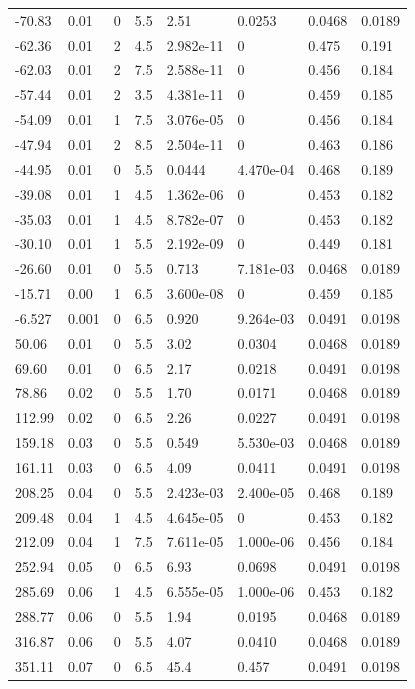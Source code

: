 \documentclass[preview]{standalone}
\begin{document}
{{\begin{tabular}{L{1.2cm}C{1.2cm} C{0.3cm}C{0.5cm} C{1.4cm}C{1.4cm} C{1.4cm}C{1.4cm}}
  -70.83  &  0.01  & 0     & 5.5 &  2.51  & 0.0253  & 0.0468 &  0.0189   \\ 
  -62.36  &  0.01  & 2     & 4.5 &  2.982e-11  & 0  & 0.475 &  0.191   \\ 
  -62.03  &  0.01  & 2     & 7.5 &  2.588e-11  & 0  & 0.456 &  0.184   \\ 
  -57.44  &  0.01  & 2     & 3.5 &  4.381e-11  & 0  & 0.459 &  0.185   \\ 
  -54.09  &  0.01  & 1     & 7.5 &  3.076e-05  & 0  & 0.456 &  0.184   \\ 
  -47.94  &  0.01  & 2     & 8.5 &  2.504e-11  & 0  & 0.463 &  0.186   \\ 
  -44.95  &  0.01  & 0     & 5.5 &  0.0444  & 4.470e-04  & 0.468 &  0.189   \\ 
  -39.08  &  0.01  & 1     & 4.5 &  1.362e-06  & 0  & 0.453 &  0.182   \\ 
  -35.03  &  0.01  & 1     & 4.5 &  8.782e-07  & 0  & 0.453 &  0.182   \\ 
  -30.10  &  0.01  & 1     & 5.5 &  2.192e-09  & 0  & 0.449 &  0.181   \\ 
  -26.60  &  0.01  & 0     & 5.5 &  0.713  & 7.181e-03  & 0.0468 &  0.0189   \\ 
  -15.71  &  0.00  & 1     & 6.5 &  3.600e-08  & 0  & 0.459 &  0.185   \\ 
  -6.527  &  0.001  & 0     & 6.5 &  0.920  & 9.264e-03  & 0.0491 &  0.0198   \\ 
  50.06  &  0.01  & 0     & 5.5 &  3.02  & 0.0304  & 0.0468 &  0.0189   \\ 
  69.60  &  0.01  & 0     & 6.5 &  2.17  & 0.0218  & 0.0491 &  0.0198   \\ 
  78.86  &  0.02  & 0     & 5.5 &  1.70  & 0.0171  & 0.0468 &  0.0189   \\ 
  112.99  &  0.02  & 0     & 6.5 &  2.26  & 0.0227  & 0.0491 &  0.0198   \\ 
  159.18  &  0.03  & 0     & 5.5 &  0.549  & 5.530e-03  & 0.0468 &  0.0189   \\ 
  161.11  &  0.03  & 0     & 6.5 &  4.09  & 0.0411  & 0.0491 &  0.0198   \\ 
  208.25  &  0.04  & 0     & 5.5 &  2.423e-03  & 2.400e-05  & 0.468 &  0.189   \\ 
  209.48  &  0.04  & 1     & 4.5 &  4.645e-05  & 0  & 0.453 &  0.182   \\ 
  212.09  &  0.04  & 1     & 7.5 &  7.611e-05  & 1.000e-06  & 0.456 &  0.184   \\ 
  252.94  &  0.05  & 0     & 6.5 &  6.93  & 0.0698  & 0.0491 &  0.0198   \\ 
  285.69  &  0.06  & 1     & 4.5 &  6.555e-05  & 1.000e-06  & 0.453 &  0.182   \\ 
  288.77  &  0.06  & 0     & 5.5 &  1.94  & 0.0195  & 0.0468 &  0.0189   \\ 
  316.87  &  0.06  & 0     & 5.5 &  4.07  & 0.0410  & 0.0468 &  0.0189   \\ 
  351.11  &  0.07  & 0     & 6.5 &  45.4  & 0.457  & 0.0491 &  0.0198   \\ 
\hline 
\end{tabular} 

}}
\end{document}
